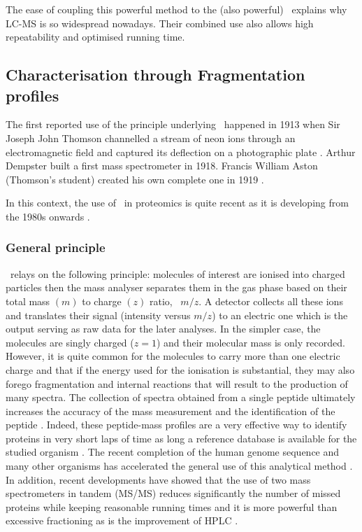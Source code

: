 The ease of coupling this powerful method to the (also powerful) \ms\ explains
why \gls{LC-MS} is so widespread nowadays. Their combined use also allows high
repeatability and optimised running time.

\subsection{Characterisation through Fragmentation profiles}

The first reported use of the principle underlying \ms\ happened in 1913 when
Sir Joseph John Thomson channelled a stream of neon ions through an electromagnetic
field and captured its deflection on a photographic plate .
Arthur Dempster built a first mass spectrometer in 1918. Francis  William
Aston (Thomson's student) created his own complete one in 1919 .
\begin{comment}
\ms\ became rapidly a pillar
of the so-called \emph{modern analytical techniques} in Chemistry as it allows
for a large spectrum of molecules of interest, the detection,
the characterisation and even, for the smaller ones, the resolution of their
structures.
\end{comment}
In this context, the use of \ms\ in proteomics is quite recent as it
is developing from the 1980s onwards .

\subsubsection{General principle}

\ms\ relays on the following principle: molecules of interest are ionised
into charged particles then the mass analyser separates them in the gas phase
based on their total mass $(m)$ to charge $(z)$ ratio, \ie\ $m/z$.
A detector collects all these ions and translates their signal (intensity versus
$m/z$) to an electric one which is the output serving as raw data for the
later analyses. In the simpler case, the molecules are singly charged ($z=1$) and
their molecular mass is only recorded. However, it is quite common for the
molecules to carry more than one electric charge and that if the energy used for
the ionisation is substantial, they may also forego fragmentation and internal
reactions that will result to the production of many spectra. The collection
of spectra obtained from a single peptide ultimately increases the accuracy of
the mass measurement and the identification of the peptide .
Indeed, these peptide-mass profiles are a very effective way to identify
proteins in very short laps of time as long a reference database is available
for the studied organism . The recent completion of the human
genome sequence and many other organisms has accelerated the general use of this
analytical method . In addition, recent developments have
showed that the use of two mass spectrometers in tandem (\gls{MS/MS}) reduces
significantly the number of missed proteins while keeping reasonable running
times and it is more powerful than excessive fractioning as is the improvement
of \gls{HPLC} .

